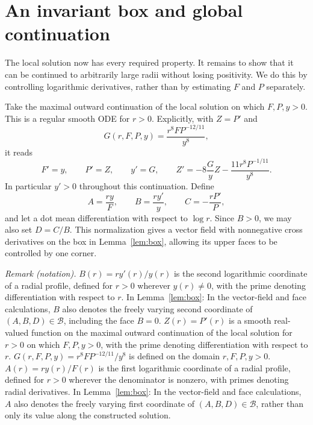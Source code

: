\documentclass[11pt]{article}
\theoremstyle{remark}
\begin{document}
\section{An invariant box and global continuation}\label{sec:global}
The local solution now has every required property.  It remains
to show that it can be continued to arbitrarily large radii without
losing positivity.  We do this by controlling logarithmic derivatives,
rather than by estimating $F$ and $P$ separately.

Take the maximal outward continuation of the local solution on
which $F,P,y>0$.  This is a regular smooth ODE for $r>0$.
Explicitly, with $Z=P'$ and
\[
 G(r,F,P,y)=\frac{r^8FP^{-12/11}}{y^8},
\]
it reads
\begin{equation}\label{eq:regular}
 F'=y,\qquad P'=Z,\qquad y'=G,\qquad
 Z'=-8\frac Gy Z-\frac{11r^8P^{-1/11}}{y^8}.
\end{equation}
In particular $y'>0$ throughout this continuation.
Define
\begin{equation}\label{eq:ratios}
 A=\frac{ry}{F},\qquad B=\frac{ry'}y,
 \qquad C=-\frac{rP'}P,
\end{equation}
and let a dot mean differentiation with respect to $\log r$.
Since $B>0$, we may also set $D=C/B$.
This normalization gives a vector field with nonnegative cross
derivatives on the box in Lemma~\ref{lem:box}, allowing its upper
faces to be controlled by one corner.

\noindent\textit{Remark (notation).} $B(r)=r y'(r)/y(r)$ is the second logarithmic coordinate of a radial profile, defined for $r>0$ wherever $y(r)\ne0$, with the prime denoting differentiation with respect to $r$. In Lemma~\ref{lem:box}: In the vector-field and face calculations, $B$ also denotes the freely varying second coordinate of $(A,B,D)\in\mathcal B$, including the face $B=0$. $Z(r)=P'(r)$ is a smooth real-valued function on the maximal outward continuation of the local solution for $r>0$ on which $F,P,y>0$, with the prime denoting differentiation with respect to $r$. $G(r,F,P,y)=r^8FP^{-12/11}/y^8$ is defined on the domain $r,F,P,y>0$. $A(r)=r y(r)/F(r)$ is the first logarithmic coordinate of a radial profile, defined for $r>0$ wherever the denominator is nonzero, with primes denoting radial derivatives. In Lemma~\ref{lem:box}: In the vector-field and face calculations, $A$ also denotes the freely varying first coordinate of $(A,B,D)\in\mathcal B$, rather than only its value along the constructed solution.
\end{document}
